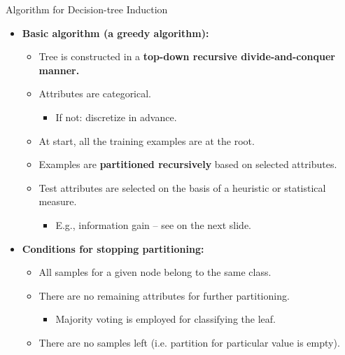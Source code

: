 \begin{frame}{Algorithm for Decision-tree Induction}
  \begin{itemize}
  \item \textbf{Basic algorithm (a greedy algorithm):}
    \begin{itemize}
    \item Tree is constructed in a \textbf{\color{airforceblue}top-down recursive divide-and-conquer manner.}
    \item Attributes are categorical.
      \begin{itemize}
      \item If not: discretize in advance.
      \end{itemize}
    \item At start, all the training examples are at the root.
    \item Examples are \textbf{\color{airforceblue}partitioned recursively} based on selected attributes.
    \item Test attributes are selected on the basis of a heuristic or statistical measure.
      \begin{itemize}
      \item E.g., information gain -- see on the next slide.
      \end{itemize}
    \end{itemize}
  \item \textbf{Conditions for stopping partitioning:}
    \begin{itemize}
    \item All samples for a given node belong to the same class.
    \item There are no remaining attributes for further partitioning.
      \begin{itemize}
      \item Majority voting is employed for classifying the leaf.
      \end{itemize}
    \item There are no samples left (i.e. partition for particular value is empty).
    \end{itemize}
  \end{itemize}
\end{frame}


